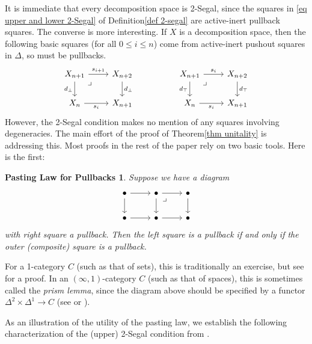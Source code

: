 \documentclass{amsart}
\newtheorem*{pastinglaw}{Pasting Law for Pullbacks}
\theoremstyle{definition}
\theoremstyle{remark}
\begin{document}
It is immediate that every decomposition space is 2-Segal, since the squares in \eqref{eq upper and lower 2-Segal} of Definition\nobreakspace \ref {def 2-segal} are active-inert pullback squares.
The converse is more interesting.
If $X$ is a decomposition space, then the following basic squares (for all $0 \leq i \leq n$) come from active-inert pushout squares in $\Delta$, so must be pullbacks.
\[ \begin{tikzcd}
X_{n+1} \rar{s_{i+1}} \dar[swap]{d_\bot} \ar[dr, phantom, "\lrcorner" very near start]  & X_{n+2} \dar{d_\bot} 
& &
X_{n+1} \rar{s_i} \dar[swap]{d_\top} \ar[dr, phantom, "\lrcorner" very near start]  & X_{n+2} \dar{d_\top} 
\\
X_n  \rar[swap]{s_i} & X_{n+1} 
& &
X_n  \rar[swap]{s_i} & X_{n+1}
\end{tikzcd}
\]
However, the 2-Segal condition makes no mention of any squares involving degeneracies.
The main effort of the proof of Theorem\nobreakspace \ref {thm unitality} is addressing this.
Most proofs in the rest of the paper rely on two basic tools.
Here is the first:

\begin{pastinglaw}
Suppose we have a diagram
\[ \begin{tikzcd}
\bullet \rar \dar & \bullet \rar \dar \ar[dr, phantom, "\lrcorner" very near start] & \bullet \dar \\
\bullet \rar & \bullet \rar & \bullet 
\end{tikzcd} \]
with right square a pullback.
Then the left square is a pullback if and only if the outer (composite) square is a pullback.
\end{pastinglaw}

For a 1-category $C$ (such as that of sets), this is traditionally an exercise, but see \cite[Proposition 2.5.9]{Borceux:HCA1} for a proof.
In an $(\infty,1)$-category $C$ (such as that of spaces), this is sometimes called the \emph{prism lemma}, since the diagram above should be specified by a functor $\Delta^2 \times \Delta^1 \to C$ (see \cite[Lemma 4.4.2.1]{Lurie:HTT} or \cite[\href{https://kerodon.net/tag/03FZ}{Tag 03FZ}]{kerodon}).

As an illustration of the utility of the pasting law, we establish the following characterization of the (upper) 2-Segal condition from \cite[Lemma 3.6]{GKT1}.
\end{document}
